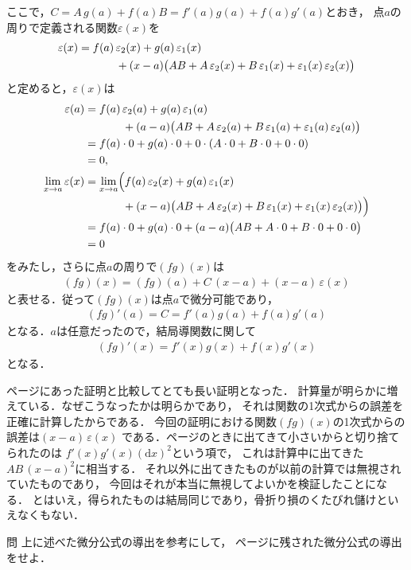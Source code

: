 ここで，$C=A \, g(a) + f(a) B = f'(a)g(a) + f(a)g'(a)$とおき，
点$a$の周りで定義される関数$\varepsilon(x)$を
\begin{align*}
\varepsilon(x) & = f(a) \, \varepsilon_2(x) + g(a) \, \varepsilon_1(x) \\
& \hspace{1.2cm} + (x-a) \bigl( AB + A \, \varepsilon_2(x) + B \, \varepsilon_1(x) 
+ \varepsilon_1(x) \, \varepsilon_2(x) \bigr)
\end{align*}
と定めると，$\varepsilon(x)$は
\begin{align*}
\varepsilon(a) & = f(a) \, \varepsilon_2(a) + g(a) \, \varepsilon_1(a) \\
& \hspace{1.2cm} + (a-a) \bigl( AB + A \, \varepsilon_2(a) + B \, \varepsilon_1(a) 
+ \varepsilon_1(a) \, \varepsilon_2(a) \bigr) \\
& = f(a) \cdot 0 + g(a) \cdot 0 + 0 \cdot ( A \cdot 0 + B \cdot 0 + 0 \cdot 0 ) \\
& = 0, \\
\lim_{x \to a} \varepsilon(x) & = 
\lim_{x \to a} \Bigl( f(a) \, \varepsilon_2(x) + g(a) \, \varepsilon_1(x) \\
& \hspace{1.2cm} + (x-a) \bigl( AB + A \, \varepsilon_2(x) + B \, \varepsilon_1(x) 
+ \varepsilon_1(x) \, \varepsilon_2(x) \bigr) \Bigr) \\
& = f(a) \cdot 0 + g(a) \cdot 0 + (a-a) \bigl( AB + A \cdot 0 + B \cdot 0 + 0 \cdot 0 \bigr) \\
& = 0
\end{align*}
をみたし，さらに点$a$の周りで$(fg)(x)$は
\begin{align*}
(fg)(x) = (fg)(a) + C \, (x-a) + (x-a) \, \varepsilon(x)
\end{align*}
と表せる．従って$(fg)(x)$は点$a$で微分可能であり，
\begin{align*}
(fg)'(a) = C = f'(a)g(a) + f(a) g'(a)
\end{align*}
となる．$a$は任意だったので，結局導関数に関して
\begin{align*}
(fg)'(x) = f'(x)g(x) + f(x)g'(x)
\end{align*}
となる．

\pageref{eq:sekibibunn}ページにあった証明と比較してとても長い証明となった．
計算量が明らかに増えている．なぜこうなったかは明らかであり，
それは関数の1次式からの誤差を正確に計算したからである．
今回の証明における関数$(fg)(x)$の1次式からの誤差は$(x-a) \, \varepsilon(x)$
である．\pageref{eq:sekibibunn}ページのときに出てきて小さいからと切り捨てられたのは
$f'(x)g'(x)(\mathrm{d}x)^2$という項で，
これは計算中に出てきた$AB \, (x-a)^2$に相当する．
それ以外に出てきたものが以前の計算では無視されていたものであり，
今回はそれが本当に無視してよいかを検証したことになる．
とはいえ，得られたものは結局同じであり，骨折り損のくたびれ儲けといえなくもない．
\begin{itembox}[l]{問}
上に述べた微分公式の導出を参考にして，
\pageref{eq:sekibibunn}ページに残された微分公式の導出をせよ．
\end{itembox}

